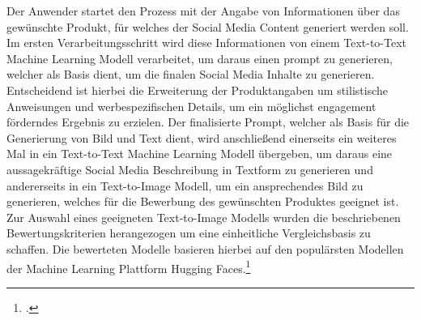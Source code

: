 Der Anwender startet den Prozess mit der Angabe von Informationen über das gewünschte Produkt, für welches der Social Media Content generiert werden soll.
Im ersten Verarbeitungsschritt wird diese Informationen von einem Text-to-Text Machine Learning Modell verarbeitet, um daraus einen prompt zu generieren, welcher als Basis dient, um die finalen Social Media Inhalte zu generieren.
Entscheidend ist hierbei die Erweiterung der Produktangaben um stilistische Anweisungen und werbespezifischen Details, um ein möglichst engagement förderndes Ergebnis zu erzielen.
Der finalisierte Prompt, welcher als Basis für die Generierung von Bild und Text dient, wird anschließend einerseits ein weiteres Mal in ein Text-to-Text Machine Learning Modell übergeben, um daraus eine aussagekräftige Social Media Beschreibung in Textform zu generieren und andererseits in ein Text-to-Image Modell, um ein ansprechendes Bild zu generieren, welches für die Bewerbung des gewünschten Produktes geeignet ist.
Zur Auswahl eines geeigneten Text-to-Image Modells wurden die beschriebenen Bewertungskriterien herangezogen um eine einheitliche Vergleichsbasis zu schaffen.
Die bewerteten Modelle basieren hierbei auf den populärsten Modellen der Machine Learning Plattform Hugging Faces.\footcite{huggingface_models}

